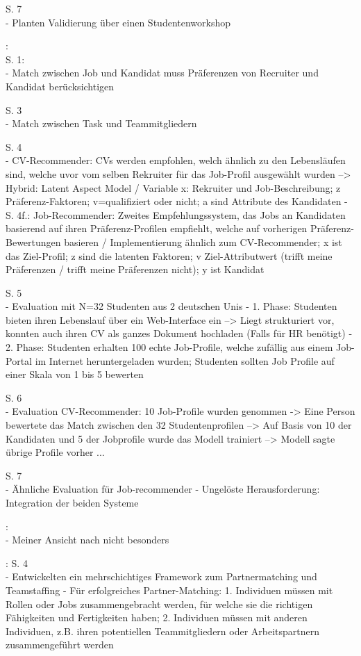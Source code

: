 S. 7\\
- Planten Validierung über einen Studentenworkshop

\textcite{malinowski:2006}:\\
S. 1:\\
- Match zwischen Job und Kandidat muss Präferenzen von Recruiter und Kandidat berücksichtigen

S. 3\\
- Match zwischen Task und Teammitgliedern

S. 4\\
- CV-Recommender: CVs werden empfohlen, welch ähnlich zu den Lebensläufen sind, welche uvor vom selben Rekruiter für das Job-Profil ausgewählt wurden --> Hybrid: Latent Aspect Model / Variable x: Rekruiter und Job-Beschreibung; z Präferenz-Faktoren; v=qualifiziert oder nicht; a sind Attribute des Kandidaten
- S. 4f.: Job-Recommender: Zweites Empfehlungssystem, das Jobs an Kandidaten basierend auf ihren Präferenz-Profilen empfiehlt, welche auf vorherigen Präferenz-Bewertungen basieren / Implementierung ähnlich zum CV-Recommender; x ist das Ziel-Profil; z sind die latenten Faktoren; v Ziel-Attributwert (trifft meine Präferenzen / trifft meine Präferenzen nicht); y ist Kandidat

S. 5\\
- Evaluation mit N=32 Studenten aus 2 deutschen Unis
- 1. Phase: Studenten bieten ihren Lebenslauf über ein Web-Interface ein --> Liegt strukturiert vor, konnten auch ihren CV als ganzes Dokument hochladen (Falls für HR benötigt)
- 2. Phase: Studenten erhalten 100 echte Job-Profile, welche zufällig aus einem Job-Portal im Internet heruntergeladen wurden; Studenten sollten Job Profile auf einer Skala von 1 bis 5 bewerten

S. 6\\
- Evaluation CV-Recommender: 10 Job-Profile wurden genommen -> Eine Person bewertete das Match zwischen den 32 Studentenprofilen --> Auf Basis von 10 der Kandidaten und 5 der Jobprofile wurde das Modell trainiert --> Modell sagte übrige Profile vorher ...

S. 7\\
- Ähnliche Evaluation für Job-recommender
- Ungelöste Herausforderung: Integration der beiden Systeme

\textcite{faerber:2003}:\\
- Meiner Ansicht nach nicht besonders

\textcite{keim:2007}:
S. 4\\
- Entwickelten ein mehrschichtiges Framework zum Partnermatching und Teamstaffing
- Für erfolgreiches Partner-Matching: 1. Individuen müssen mit Rollen oder Jobs zusammengebracht werden, für welche sie die richtigen Fähigkeiten und Fertigkeiten haben; 2. Individuen müssen mit anderen Individuen, z.B. ihren potentiellen Teammitgliedern oder Arbeitspartnern zusammengeführt werden

